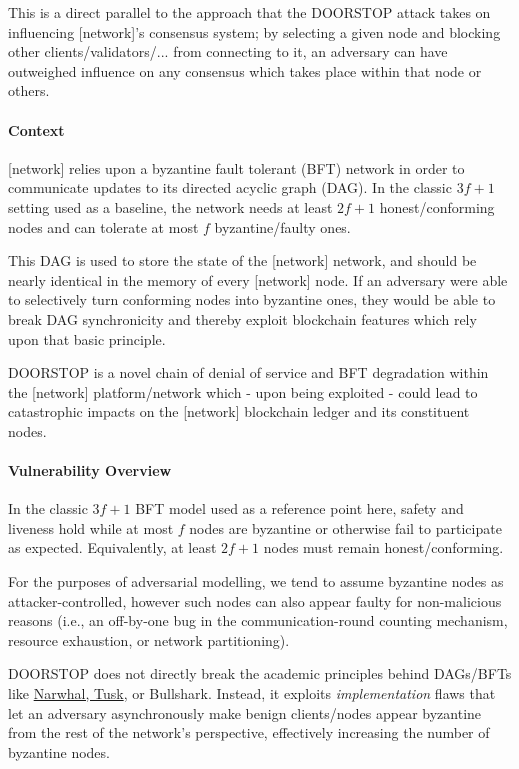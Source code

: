 This is a direct parallel to the approach that the DOORSTOP attack takes on influencing [network]'s consensus system; by selecting a given node and blocking other clients/validators/... from connecting to it, an adversary can have outweighed influence on any consensus which takes place within that node or others.

\paragraph{Context}

[network] relies upon a byzantine fault tolerant (BFT) network in order to communicate updates to its directed acyclic graph (DAG). In the classic $3f + 1$ setting used as a baseline, the network needs at least $2f + 1$ honest/conforming nodes and can tolerate at most $f$ byzantine/faulty ones.

This DAG is used to store the state of the [network] network, and should be nearly identical in the memory of every [network] node. If an adversary were able to selectively turn conforming nodes into byzantine ones, they would be able to break DAG synchronicity and thereby exploit blockchain features which rely upon that basic principle.

DOORSTOP is a novel chain of denial of service and BFT degradation within the [network] platform/network which - upon being exploited - could lead to catastrophic impacts on the [network] blockchain ledger and its constituent nodes.

\paragraph{Vulnerability Overview}

In the classic $3f + 1$ BFT model used as a reference point here, safety and liveness hold while at most $f$ nodes are byzantine or otherwise fail to participate as expected. Equivalently, at least $2f + 1$ nodes must remain honest/conforming.

For the purposes of adversarial modelling, we tend to assume byzantine nodes as attacker-controlled, however such nodes can also appear faulty for non-malicious reasons (i.e., an off-by-one bug in the communication-round counting mechanism, resource exhaustion, or network partitioning).

DOORSTOP does not directly break the academic principles behind DAGs/BFTs like \href{https://aptoslabs.com/pdf/2105.11827.pdf}{Narwhal, Tusk}, or Bullshark. Instead, it exploits \emph{implementation} flaws that let an adversary asynchronously make benign clients/nodes appear byzantine from the rest of the network's perspective, effectively increasing the number of byzantine nodes.


